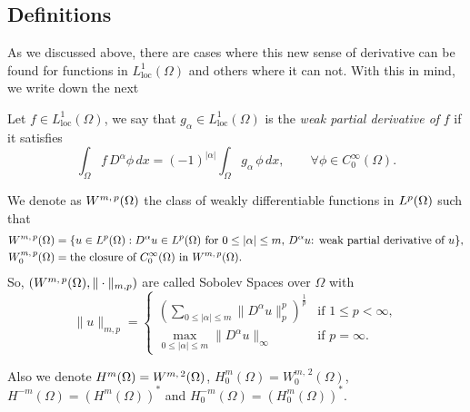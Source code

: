 \subsection*{Definitions} 
As we discussed above, there are cases where this new sense of derivative can be found for functions in $L_\text{loc}^1(\Omega)$ and others where it can not. With this in mind, we write down the next
\begin{definition} Let $f\in L_\text{loc}^1(\Omega)$, we say that $g_\alpha\in L_\text{loc}^1(\Omega)$ is the \emph{weak partial derivative of} $f$ if it satisfies
\begin{equation}
\int_\Omega f\,D^\alpha \phi\,dx=(-1)^{|\alpha|} \int_\Omega g_\alpha\,\phi\,dx,\qquad \forall \phi \in C_0^\infty(\Omega).
\end{equation}
\end{definition}
\begin{definition}We denote as ${W^{m,\,p}(\Omega)}$ the class of weakly differentiable functions in ${L^{p}(\Omega)}$ such that
\begin{align*}
{W^{m,\,p}(\Omega)}&=\{u\in{L^{p}(\Omega)}:D^{\alpha}u\in {L^{p}(\Omega)} \text{ for }0\leq |\alpha| \leq m,\, D^{\alpha}u\text{: weak partial derivative of }u\},\\
W^{m,\,p}_0(\Omega)&=\text{the closure of }C_0^\infty(\Omega)\text{ in }{W^{m,\,p}(\Omega)}.
\end{align*}
So, $\left({W^{m,\,p}(\Omega)},\|\cdot\|_{m,p}\right)$ are called Sobolev Spaces over $\Omega$ with
\begin{equation}
\|u\|_{m,p}=\left\{\begin{array}{ll}
\left(\sum_{0\leq|\alpha|\leq m}\|D^\alpha u\|^p_p \right) ^\frac{1}{p}&\text{if }1\leq p < \infty,\\
\max_{0\leq|\alpha|\leq m}\|D^\alpha u\|_\infty&\text{if }p=\infty.
\end{array}\right.
\end{equation}

Also we denote $H^m(\Omega)={W^{m,\,2}(\Omega)}$, $H_0^m(\Omega)=W^{m,\,2}_0(\Omega)$, $H^{-m}(\Omega)=\left(H^m(\Omega)\right)^*$ and $H_0^{-m}(\Omega)=\left(H_0^m(\Omega)\right)^*$.
\end{definition}


